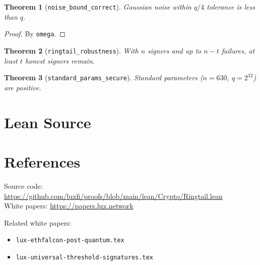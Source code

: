 \documentclass[11pt]{article}
\newtheorem{theorem}{Theorem}
\begin{document}
\begin{theorem}[\texttt{noise\_bound\_correct}]
Gaussian noise within $q/4$ tolerance is less than $q$.
\end{theorem}
\begin{proof}
By \texttt{omega}.
\end{proof}

\begin{theorem}[\texttt{ringtail\_robustness}]
With $n$ signers and up to $n-t$ failures, at least $t$ honest signers remain.
\end{theorem}

\begin{theorem}[\texttt{standard\_params\_secure}]
Standard parameters ($n=630$, $q=2^{32}$) are positive.
\end{theorem}


\section{Lean Source}


\section{References}
\noindent Source code: \url{https://github.com/luxfi/proofs/blob/main/lean/Crypto/Ringtail.lean}\\
\noindent White papers: \url{https://papers.lux.network}

\noindent Related white papers:
\begin{itemize}
  \item \texttt{lux-ethfalcon-post-quantum.tex}
  \item \texttt{lux-universal-threshold-signatures.tex}
\end{itemize}
\end{document}
